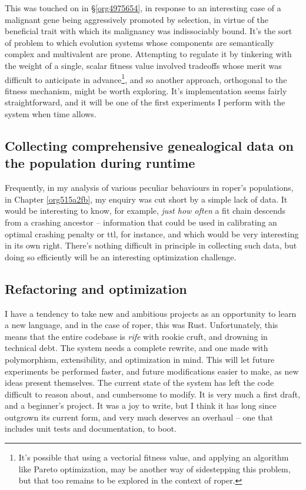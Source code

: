 \documentclass[12pt,glossary]{dalthesis}
\begin{document}
This was touched on in \S \ref{org4975654}, in response to an interesting case
of a malignant gene being aggressively promoted by selection, in virtue of the
beneficial trait with which its malignancy was indissociably bound. It's the
sort of problem to which evolution systems whose components are semantically
complex and multivalent are prone. Attempting to regulate it by tinkering with
the weight of a single, scalar fitness value involved tradeoffs whose merit was
difficult to anticipate in advance\footnote{It's possible that using a vectorial fitness value, and applying an algorithm
  like Pareto optimization, may be another way of sidestepping this problem, but
  that too remains to be explored in the context of \gls{roper}.}, and so another approach, orthogonal to the fitness mechanism, might be worth
exploring. It's implementation seems fairly straightforward, and it will be one
of the first experiments I perform with the system when time allows. 

\subsection{Collecting comprehensive genealogical data on the population during runtime}
\label{sec:org230101f}

Frequently, in my analysis of various peculiar behaviours in \gls{roper}'s
populations, in Chapter \ref{org515a2fb}, my enquiry was cut short by a simple
lack of data. It would be interesting to know, for example, \emph{just how often} a
fit chain descends from a crashing ancestor -- information that could be used in
calibrating an optimal crashing penalty or \gls{ttl}, for instance, and which would
be very interesting in its own right. There's nothing difficult in principle in
collecting such data, but doing so efficiently will be an interesting optimization
challenge. 

\subsection{Refactoring and optimization}
\label{sec:orge454d73}

I have a tendency to take new and ambitious projects as an opportunity to learn
a new language, and in the case of \gls{roper}, this was Rust. Unfortunately, this
means that the entire codebase is \emph{rife} with rookie cruft, and drowning in 
technical debt. The system needs a complete rewrite, and one made with polymorphism,
extensibility, and optimization in mind. This will let future experiments be 
performed faster, and future modifications easier to make, as new ideas present
themselves. The current state of the system has left the code difficult to reason
about, and cumbersome to modify. It is very much a first draft, and a beginner's
project. It was a joy to write, but I think it has long since outgrown its current
form, and very much deserves an overhaul -- one that includes unit tests and
documentation, to boot. 
\end{document}
